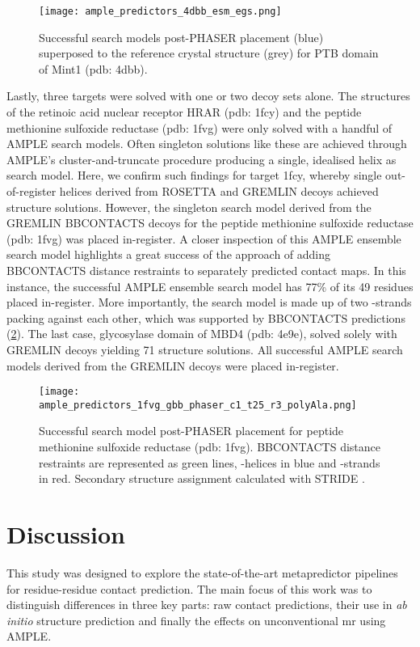 \begin{figure}[H]
    \centering
    \texttt{[image: ample\_predictors\_4dbb\_esm\_egs.png]}
    \caption{Successful search models post-PHASER placement (blue) superposed to the reference crystal structure (grey) for PTB domain of Mint1 (\gls{pdb}: 4dbb).}
    \label{fig:ample_predictors_4dbb_esm_egs}
\end{figure}

Lastly, three targets were solved with one or two decoy sets alone. The structures of the retinoic acid nuclear receptor HRAR (\gls{pdb}: 1fcy) and the peptide methionine sulfoxide reductase (\gls{pdb}: 1fvg) were only solved with a handful of AMPLE search models. Often singleton solutions like these are achieved through AMPLE’s cluster-and-truncate procedure producing a single, idealised helix as search model. Here, we confirm such findings for target 1fcy, whereby single out-of-register helices derived from ROSETTA and GREMLIN decoys achieved structure solutions. However, the singleton search model derived from the GREMLIN BBCONTACTS decoys for the peptide methionine sulfoxide reductase (\gls{pdb}: 1fvg) was placed in-register. A closer inspection of this AMPLE ensemble search model highlights a great success of the approach of adding BBCONTACTS distance restraints to separately predicted contact maps. In this instance, the successful AMPLE ensemble search model has 77\% of its 49 residues placed in-register. More importantly, the search model is made up of two \textbeta-strands packing against each other, which was supported by BBCONTACTS predictions (\cref{fig:ample_predictors_1fvg_gbb_phaser_c1_t25_r3_polyAla}). The last case, glycosylase domain of MBD4 (\gls{pdb}: 4e9e), solved solely with GREMLIN decoys yielding 71 structure solutions. All successful AMPLE search models derived from the GREMLIN decoys were placed in-register.

\begin{figure}[H]
    \centering
    \texttt{[image: ample\_predictors\_1fvg\_gbb\_phaser\_c1\_t25\_r3\_polyAla.png]}
    \caption{Successful search model post-PHASER placement for peptide methionine sulfoxide reductase (\gls{pdb}: 1fvg). BBCONTACTS distance restraints are represented as green lines, \textalpha-helices in blue and \textbeta-strands in red. Secondary structure assignment calculated with STRIDE \cite{Frishman1995-ns}.}
    \label{fig:ample_predictors_1fvg_gbb_phaser_c1_t25_r3_polyAla}
\end{figure}

\section{Discussion}
This study was designed to explore the state-of-the-art metapredictor pipelines for residue-residue contact prediction. The main focus of this work was to distinguish differences in three key parts: raw contact predictions, their use in  \textit{ab initio} structure prediction and finally the effects on unconventional \gls{mr} using AMPLE.

